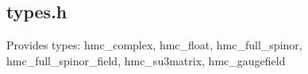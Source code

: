 \subsection{types.h}
Provides types: hmc\_complex, hmc\_float, hmc\_full\_spinor, hmc\_full\_spinor\_field, hmc\_su3matrix, hmc\_gaugefield